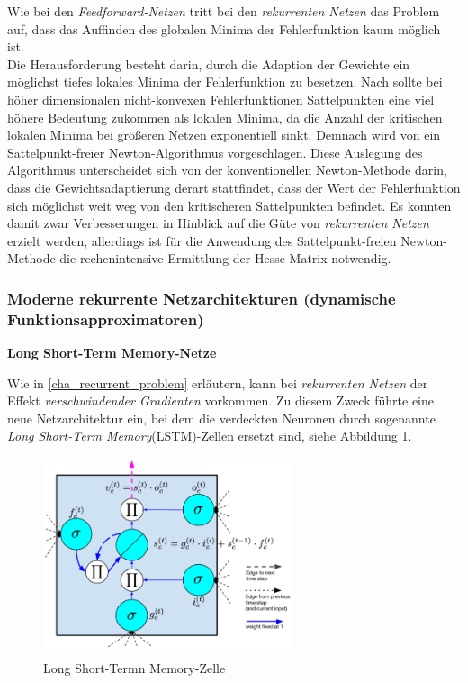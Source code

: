 Wie bei den \textit{Feedforward-Netzen} tritt bei den \textit{rekurrenten Netzen} das Problem auf, dass das Auffinden des globalen Minima der Fehlerfunktion kaum möglich ist. \\
Die Herausforderung besteht darin, durch die Adaption der Gewichte ein möglichst tiefes lokales Minima der Fehlerfunktion zu besetzen. Nach \cite{Dauphin.6102014} sollte bei höher dimensionalen nicht-konvexen Fehlerfunktionen Sattelpunkten eine viel höhere Bedeutung zukommen als lokalen Minima, da die Anzahl der kritischen lokalen Minima bei größeren Netzen exponentiell sinkt. Demnach wird von \cite{Dauphin.6102014} ein Sattelpunkt-freier Newton-Algorithmus vorgeschlagen. Diese Auslegung des Algorithmus unterscheidet sich von der konventionellen Newton-Methode darin, dass die Gewichtsadaptierung derart stattfindet, dass der Wert der Fehlerfunktion sich möglichst weit weg von den kritischeren Sattelpunkten befindet. Es konnten damit zwar Verbesserungen in Hinblick auf die Güte von \textit{rekurrenten Netzen} erzielt werden, allerdings ist für die Anwendung des Sattelpunkt-freien Newton-Methode die rechenintensive Ermittlung der Hesse-Matrix notwendig. \cite{Dauphin.6102014}  

\subsubsection{Moderne rekurrente Netzarchitekturen (dynamische Funktionsapproximatoren)}
\label{cha:lstm}
\textbf{Long Short-Term Memory-Netze}

Wie in \ref{cha_recurrent_problem} erläutern, kann bei \textit{rekurrenten Netzen} der Effekt \textit{verschwindender Gradienten} vorkommen. Zu diesem Zweck führte \cite{Hochreiter.2001} eine neue Netzarchitektur ein, bei dem die verdeckten Neuronen durch sogenannte \textit{Long Short-Term Memory}(LSTM)-Zellen ersetzt sind, siehe Abbildung \ref{fig:lstm}.


\begin{figure} [h]
	\centering
	\includegraphics[width=0.65\textwidth]{images/LSTM}
	\caption{Long Short-Termn Memory-Zelle \cite{Lipton.5292015}}
	\label{fig:lstm}
\end{figure}

